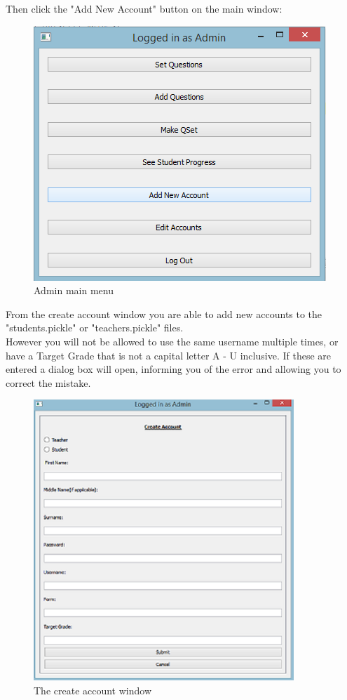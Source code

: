 \documentclass{report}
\begin{document}
\bigskip
Then click the "Add New Account" button on the main window:\\
\bigskip
\begin{figure}[h]
\centering
\includegraphics{adminmain}
\caption{Admin main menu}
\label{fig:adminmain}
\end{figure}


From the create account window you are able to add new accounts to the "students.pickle" or "teachers.pickle" files.\\
However you will not be allowed to use the same username multiple times, or have a Target Grade that is not a capital letter A - U inclusive. If these are entered a dialog box will open, informing you of the error and allowing you to correct the mistake.\\
\begin{figure}[h]
\centering
\centerline{\includegraphics{addaccount}}
\caption{The create account window}
\label{fig:addaccount}
\end{figure}
\end{document}
